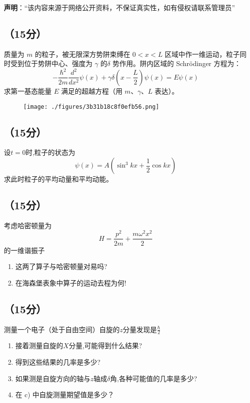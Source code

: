 
\textbf{声明}：“该内容来源于网络公开资料，不保证真实性，如有侵权请联系管理员”

\subsection{（15分）}
质量为 $m$ 的粒子，被无限深方势阱束缚在 $0 < x < L$ 区域中作一维运动，粒子同时受到位于势阱中心、强度为 $\gamma$ 的$\delta$ 势作用。阱内区域的 Schrödinger 方程为：
\[
-\frac{\hbar^2}{2m}\frac{d^2 }{dx^2}\psi(x) + \gamma \delta \left(x - \frac{L}{2}\right)\psi(x) = E \psi(x)~
\]
求第一基态能量 $E$ 满足的超越方程（用 $m$、$\gamma$、$L$ 表达）。
\begin{figure}[ht]
\centering
\texttt{[image: ./figures/3b31b18c8f0efb56.png]}
\caption{} \label{fig_SEU01_1}
\end{figure}

\subsection{（15分）}
设$t=0$时,粒子的状态为
 \[\psi(x) = A \left( \sin^3 kx + \frac{1}{2} \cos kx \right)~\]
求此时粒子的平均动量和平均动能。

\subsection{（15分）}
考虑哈密顿量为 
\[H = \frac{p^2}{2m} + \frac{m \omega^2 x^2}{2}~\]
的一维谐振子
\begin{enumerate}
    “初始位置”  和“初始动量” 的算子：
    \[
    x_0 = x \cos \omega t - \frac{p}{m \omega} \sin \omega t~
    \]
    \[
    p_0 = p \cos \omega t + m \omega x \sin \omega t~
    \]
    的期待值对时间的依赖关系。
    \item  这两了算子与哈密顿量对易吗?
    \item  在海森堡表象中算子的运动去程为何!
\end{enumerate}

\subsection{（15分）}测量一个电子（处于自由空间）自旋的$z$分量发现是$\frac{\hbar}{2}$
\begin{enumerate}
\item 接着测量自旋的$X$分量,可能得到什么结果?
\item 得到这些结果的几率是多少?
\item 如果测是自旋方向的轴与$z$轴成$\delta$角,各种可能值的几率是多少?
\item 在 c) 中自旋测量期望值是多少？
\end{enumerate}

